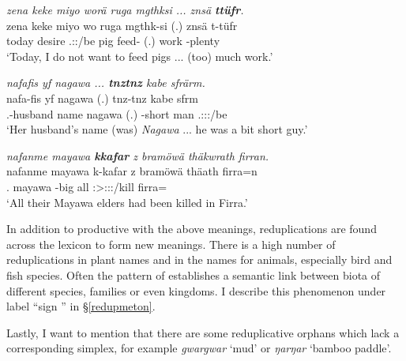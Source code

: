\begin{exe}
	\ex \emph{zena keke miyo worä ruga mgthksi ... znsä \textbf{ttüfr}.}\\
	\gll zena keke miyo wo ruga mgthk-si (.) znsä t-tüfr\\
	today \Neg{} desire \Fsg.\Sbj:\Nonpast:\Ipfv/be pig feed-\Nmlz{} (.) work \Redup-plenty\\
	\trans `Today, I do not want to feed pigs ... (too) much work.'\\
	\label{ex709}
\end{exe}
\begin{exe}
	\ex \emph{nafafis yf nagawa ... \textbf{tnztnz} kabe sfrärm.}\\
	\gll nafa-fis yf nagawa (.) tnz-tnz kabe sfrm\\
	\Third.\Poss-husband name nagawa (.) \Redup-short man \Tsg.\Masc:\Sbj:\Pst:\Dur/be\\
	\trans `Her husband's name (was) \emph{Nagawa} ... he was a bit short guy.'\\
	\label{ex710}
\end{exe}
\begin{exe}
	\ex	\emph{nafanme mayawa \textbf{kkafar} z bramöwä thäkwrath firran.}\\
	\gll nafanme mayawa k-kafar z bramöwä thäath firra=n\\
	\Tnsg.\Poss{} mayawa \Redup-big \Iam{} all \Stpl:\Sbj>\Stpl:\Obj:\Pst:\Pfv/kill firra=\Loc\\
	\trans `All their Mayawa elders had been killed in Firra.'
	\label{ex721}
\end{exe}
	
In addition to productive  with the above meanings, reduplications are found across the lexicon to form new meanings. There is a high number of reduplications in plant names and in the names for animals, especially bird and fish species. Often the pattern of  establishes a semantic link between biota of different species, families or even kingdoms. I describe this phenomenon under label ``sign '' in \S\ref{redupmeton}.%

Lastly, I want to mention that there are some reduplicative orphans which lack a corresponding simplex, for example \emph{gwargwar} `mud' or \emph{ŋarŋar} `bamboo paddle'.

